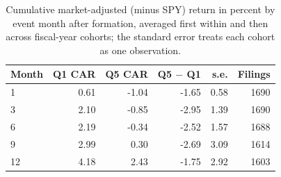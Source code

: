 \begin{table}[htbp]\centering\small
\caption{Cumulative market-adjusted (minus SPY) return in percent by event month after formation, averaged first within and then across fiscal-year cohorts; the standard error treats each cohort as one observation.}\label{tab:eventtime}
\begin{tabular}{lrrrrr}\toprule
Month & Q1 CAR & Q5 CAR & Q5 $-$ Q1 & s.e. & Filings \\ \midrule
1 & 0.61 & -1.04 & -1.65 & 0.58 & 1690 \\
3 & 2.10 & -0.85 & -2.95 & 1.39 & 1690 \\
6 & 2.19 & -0.34 & -2.52 & 1.57 & 1688 \\
9 & 2.99 & 0.30 & -2.69 & 3.09 & 1614 \\
12 & 4.18 & 2.43 & -1.75 & 2.92 & 1603 \\
\bottomrule\end{tabular}\end{table}

